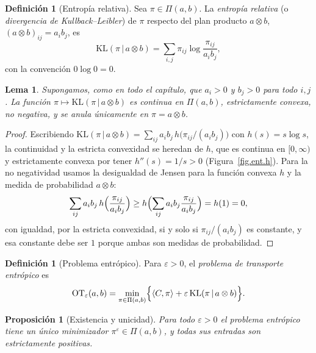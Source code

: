 \documentclass[12pt, a4paper]{amsbook}
\newtheorem{lema}[teo]{Lema}
\newtheorem{prop}[teo]{Proposición}
\theoremstyle{remark}
\theoremstyle{definition}
\newtheorem{defi}[teo]{Definición}
\numberwithin{section}{chapter}
\numberwithin{subsection}{section}
\numberwithin{equation}{section}
\numberwithin{figure}{chapter}
\begin{document}
\begin{defi}[Entropía relativa]\label{def.KL}
Sea $\pi\in\Pi(a,b)$. La \emph{entropía relativa} (o \emph{divergencia de
Kullback--Leibler}) de $\pi$ respecto del plan producto $a\otimes b$,
$(a\otimes b)_{ij}=a_ib_j$, es
\[
\mathrm{KL}(\pi\,|\,a\otimes b)=\sum_{i,j}\pi_{ij}\log\frac{\pi_{ij}}{a_ib_j},
\]
con la convención $0\log0=0$.
\end{defi}

\begin{lema}\label{lema.KL}
Supongamos, como en todo el capítulo, que $a_i>0$ y $b_j>0$ para todo $i,j$.
La función $\pi\mapsto\mathrm{KL}(\pi\,|\,a\otimes b)$ es continua en $\Pi(a,b)$,
estrictamente convexa, no negativa, y se anula únicamente en $\pi=a\otimes b$.
\end{lema}

\begin{proof}
Escribiendo $\mathrm{KL}(\pi\,|\,a\otimes b)=\sum_{ij}a_ib_j\,h\bigl(\pi_{ij}/(a_ib_j)\bigr)$
con $h(s)=s\log s$, la continuidad y la estricta convexidad se heredan de
$h$, que es continua en $[0,\infty)$ y estrictamente convexa por tener
$h''(s)=1/s>0$ (Figura~\ref{fig.ent.h}). Para la no negatividad usamos la desigualdad de Jensen para
la función convexa $h$ y la medida de probabilidad $a\otimes b$:
\[
\sum_{ij}a_ib_j\,h\Bigl(\frac{\pi_{ij}}{a_ib_j}\Bigr)
\ge h\Bigl(\sum_{ij}a_ib_j\frac{\pi_{ij}}{a_ib_j}\Bigr)=h(1)=0,
\]
con igualdad, por la estricta convexidad, si y solo si $\pi_{ij}/(a_ib_j)$ es
constante, y esa constante debe ser $1$ porque ambas son medidas de
probabilidad.
\end{proof}

\begin{defi}[Problema entrópico]\label{def.OTeps}
Para $\varepsilon>0$, el \emph{problema de transporte entrópico} es
\[
\mathrm{OT}_\varepsilon(a,b)
=\min_{\pi\in\Pi(a,b)}\Bigl\{\langle C,\pi\rangle+\varepsilon\,\mathrm{KL}(\pi\,|\,a\otimes b)\Bigr\}.
\]
\end{defi}

\begin{prop}[Existencia y unicidad]\label{prop.OTeps.existencia}
Para todo $\varepsilon>0$ el problema entrópico tiene un único minimizador
$\pi^\varepsilon\in\Pi(a,b)$, y todas sus entradas son estrictamente positivas.
\end{prop}
\end{document}
